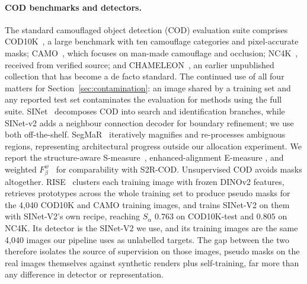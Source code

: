 \documentclass{article}
\newif\ifrevmarked \revmarkedtrue
\newenvironment{revblock}[1]{\ifrevmarked\color{#1}\fi}{}
\begin{document}
\paragraph{COD benchmarks and detectors.}
The standard camouflaged object detection (COD) evaluation suite comprises COD10K~\citep{fan2022concealed}, a large benchmark
with ten camouflage categories and pixel-accurate masks; CAMO~\citep{le2019anabranch}, which focuses
on man-made camouflage and occlusion; NC4K~\citep{lv2021simultaneously}, received from verified source; and
CHAMELEON~\citep{skurowski2018animal}, an earlier unpublished collection that has become a de facto
standard. The continued use of all four matters for Section~\ref{sec:contamination}: an image shared by a training set and any reported test set contaminates the evaluation for methods using the full suite.
SINet~\citep{fan2020sinet} decomposes COD into search and identification branches, while SINet-v2
\citep{fan2022concealed} adds a neighbour connection decoder for boundary refinement; we use both
off-the-shelf. SegMaR~\citep{jia2022segment} iteratively magnifies and re-processes ambiguous
regions, representing architectural progress outside our allocation experiment. We report the
structure-aware S-measure~\citep{fan2017structure}, enhanced-alignment E-measure
\citep{fan2018enhanced}, and weighted $F_\beta^w$~\citep{margolin2014evaluate} for comparability
with S2R-COD.
\begin{revblock}{RevA}Unsupervised COD avoids masks altogether. RISE~\citep{du2025rise} clusters each training image with frozen DINOv2
features, retrieves prototypes across the whole training set to produce pseudo masks for the 4,040 COD10K and CAMO
training images, and trains SINet-V2 on them with SINet-V2's own recipe, reaching $S_\alpha$ $0.763$ on COD10K-test
and $0.805$ on NC4K. Its detector is the SINet-V2 we use, and its training images are the same 4,040 images our
pipeline uses as unlabelled targets. The gap between the two therefore isolates the source of supervision on those
images, pseudo masks on the real images themselves against synthetic renders plus self-training, far more than any
difference in detector or representation.


\end{revblock}


\end{document}
